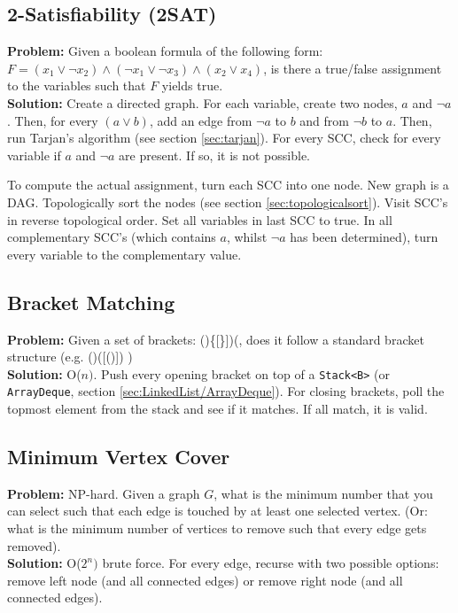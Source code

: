 \documentclass[a4paper,10pt]{article}
\begin{document}
\begin{multicols}{2}
\subsection{2-Satisfiability (2SAT)}
\textbf{Problem:} Given a boolean formula of the following form: $F=(x_1\lor\lnot x_2) \land(\lnot x_1\lor\lnot x_3)\land(x_2\lor x_4)$, is there a true/false assignment to the variables such that $F$ yields true.\\
\textbf{Solution:} Create a directed graph. For each variable, create two nodes, $a$ and $\lnot a$. Then, for every $(a\lor b)$, add an edge from $\lnot a$ to $b$ and from $\lnot b$ to $a$. Then, run Tarjan's algorithm (see section \ref{sec:tarjan}). For every SCC, check for every variable if $a$ and $\lnot a$ are present. If so, it is not possible.

To compute the actual assignment, turn each SCC into one node. New graph is a DAG. Topologically sort the nodes (see section \ref{sec:topologicalsort}). Visit SCC's in reverse topological order. Set all variables in last SCC to true. In all complementary SCC's (which contains $a$, whilst $\lnot a$ has been determined), turn every variable to the complementary value.

\subsection{Bracket Matching}
\textbf{Problem:} Given a set of brackets: ()\{[\}])(, does it follow a standard bracket structure (e.g. ()([()]) )\\
\textbf{Solution:} O($n)$. Push every opening bracket on top of a \lstinline|Stack<B>| (or \lstinline|ArrayDeque|, section \ref{sec:LinkedList/ArrayDeque}). For closing brackets, poll the topmost element from the stack and see if it matches. If all match, it is valid.
\subsection{Minimum Vertex Cover} \label{sec:MinVertexCover}
\textbf{Problem:} NP-hard. Given a graph $G$, what is the minimum number that you can select such that each edge is touched by at least one selected vertex. (Or: what is the minimum number of vertices to remove such that every edge gets removed).\\
\textbf{Solution:} O($2^n)$ brute force. For every edge, recurse with two possible options: remove left node (and all connected edges) or remove right node (and all connected edges).


\end{multicols}
\end{document}
